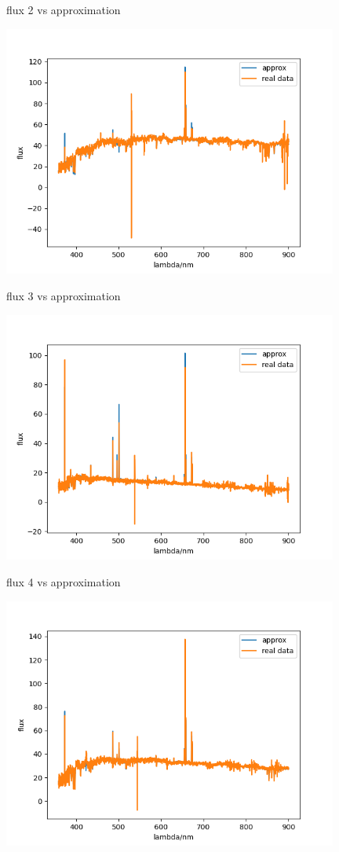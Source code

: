 \documentclass[letterpaper,12pt]{article}
\begin{document}
\begin{table}[!h]
    \centering
    \caption{flux 2 vs approximation}
    \includegraphics[width=11cm]{7-7-2.png}
\end{table}%

\begin{table}[!h]
    \centering
    \caption{flux 3 vs approximation}
    \includegraphics[width=11cm]{7-7-3.png}
\end{table}%

\begin{table}[!h]
    \centering
    \caption{flux 4 vs approximation}
    \includegraphics[width=11cm]{7-7-4.png}
\end{table}%
\end{document}
